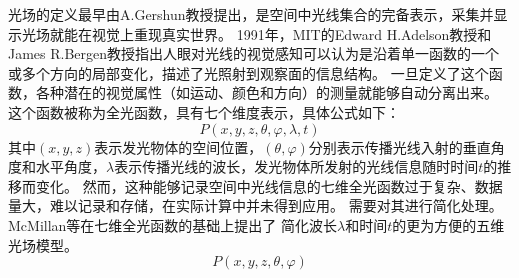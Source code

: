 %
%


%
%
%
%
%
%




\label{chap:part2}






光场的定义最早由A.Gershun教授提出，是空间中光线集合的完备表示，采集并显示光场就能在视觉上重现真实世界。
1991年，MIT的Edward H.Adelson教授和James R.Bergen教授指出人眼对光线的视觉感知可以认为是沿着单一函数的一个或多个方向的局部变化，描述了光照射到观察面的信息结构。
一旦定义了这个函数，各种潜在的视觉属性（如运动、颜色和方向）的测量就能够自动分离出来。
这个函数被称为全光函数，具有七个维度表示，具体公式如下：
\begin{equation}
	P(x,y,z,\theta,\varphi,\lambda,t)
\end{equation}
其中$(x,y,z)$表示发光物体的空间位置，$(\theta,\varphi)$分别表示传播光线入射的垂直角度和水平角度，$\lambda$表示传播光线的波长，发光物体所发射的光线信息随时时间$t$的推移而变化。
然而，这种能够记录空间中光线信息的七维全光函数过于复杂、数据量大，难以记录和存储，在实际计算中并未得到应用。
需要对其进行简化处理。
McMillan等在七维全光函数的基础上提出了
简化波长$\lambda$和时间$t$的更为方便的五维光场模型。
\begin{equation}
	P(x,y,z,\theta,\varphi)
\end{equation}


